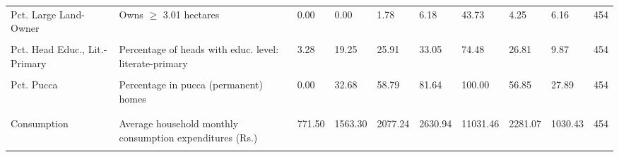 \documentclass[
]{article}
\begin{document}
\begin{landscape}
\begin{ThreePartTable}
\begin{longtable}[t]{>{\raggedright\arraybackslash}p{4cm}>{\raggedright\arraybackslash}p{6cm}lllllllr}
\hspace{1em}Pct. Large Land-Owner & Owns $\geq$ 3.01 hectares & 0.00 & 0.00 & 1.78 & 6.18 & 43.73 & 4.25 & 6.16 & 454\\
\hspace{1em}\cellcolor{gray!10}{Pct. Head Educ., Illiterate} & \cellcolor{gray!10}{Percentage of household heads with educ. level: illiterate} & \cellcolor{gray!10}{0.00} & \cellcolor{gray!10}{24.43} & \cellcolor{gray!10}{35.18} & \cellcolor{gray!10}{46.92} & \cellcolor{gray!10}{78.68} & \cellcolor{gray!10}{35.89} & \cellcolor{gray!10}{15.75} & \cellcolor{gray!10}{454}\\
\hspace{1em}Pct. Head Educ., Lit.-Primary & Percentage of heads with educ. level: literate-primary & 3.28 & 19.25 & 25.91 & 33.05 & 74.48 & 26.81 & 9.87 & 454\\
\hspace{1em}\cellcolor{gray!10}{Pct. Head Educ., Secondary+} & \cellcolor{gray!10}{Percentage of heads with educ. level: above secondary} & \cellcolor{gray!10}{0.58} & \cellcolor{gray!10}{27.28} & \cellcolor{gray!10}{35.23} & \cellcolor{gray!10}{45.23} & \cellcolor{gray!10}{78.59} & \cellcolor{gray!10}{37.30} & \cellcolor{gray!10}{13.90} & \cellcolor{gray!10}{454}\\
\hspace{1em}Pct. Pucca & Percentage in pucca (permanent) homes & 0.00 & 32.68 & 58.79 & 81.64 & 100.00 & 56.85 & 27.89 & 454\\
\addlinespace[0.3em]
\multicolumn{10}{l}{\textbf{From 2017-18:}}\\
\hspace{1em}\cellcolor{gray!10}{Population} & \cellcolor{gray!10}{Estimated via NSS sample weights} & \cellcolor{gray!10}{23,004} & \cellcolor{gray!10}{980,072} & \cellcolor{gray!10}{1,589,294} & \cellcolor{gray!10}{2,531,778} & \cellcolor{gray!10}{12,274,837} & \cellcolor{gray!10}{1,994,872} & \cellcolor{gray!10}{1,592,507} & \cellcolor{gray!10}{454}\\
\hspace{1em}Consumption & Average household monthly consumption expenditures (Rs.) & 771.50 & 1563.30 & 2077.24 & 2630.94 & 11031.46 & 2281.07 & 1030.43 & 454\\
\hspace{1em}\cellcolor{gray!10}{Gini of Consumption} & \cellcolor{gray!10}{Gini coefficient of consumption} & \cellcolor{gray!10}{0.12} & \cellcolor{gray!10}{0.20} & \cellcolor{gray!10}{0.24} & \cellcolor{gray!10}{0.29} & \cellcolor{gray!10}{0.59} & \cellcolor{gray!10}{0.25} & \cellcolor{gray!10}{0.07} & \cellcolor{gray!10}{454}\\

\end{longtable}
\end{ThreePartTable}
\end{landscape}
\end{document}
